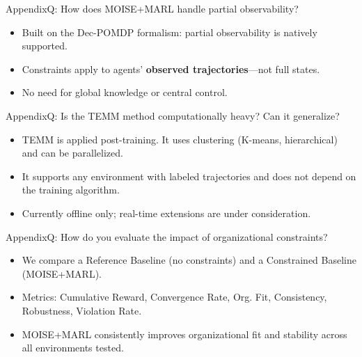 \begin{frame}{Appendix}{Q: How does MOISE+MARL handle partial observability?}
    \begin{itemize}
        \item Built on the Dec-POMDP formalism: partial observability is natively supported.
        \item Constraints apply to agents' \textbf{observed trajectories}—not full states.
        \item No need for global knowledge or central control.
    \end{itemize}
\end{frame}

\begin{frame}{Appendix}{Q: Is the TEMM method computationally heavy? Can it generalize?}
    \begin{itemize}
        \item TEMM is applied post-training. It uses clustering (K-means, hierarchical) and can be parallelized.
        \item It supports any environment with labeled trajectories and does not depend on the training algorithm.
        \item Currently offline only; real-time extensions are under consideration.
    \end{itemize}
\end{frame}

\begin{frame}{Appendix}{Q: How do you evaluate the impact of organizational constraints?}
    \begin{itemize}
        \item We compare a Reference Baseline (no constraints) and a Constrained Baseline (MOISE+MARL).
        \item Metrics: Cumulative Reward, Convergence Rate, Org. Fit, Consistency, Robustness, Violation Rate.
        \item MOISE+MARL consistently improves organizational fit and stability across all environments tested.
    \end{itemize}
\end{frame}



